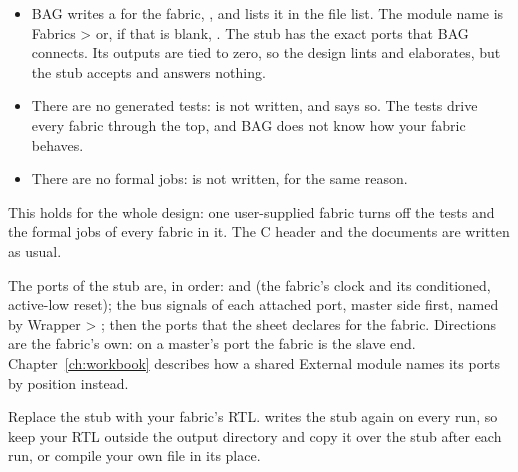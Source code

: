 \begin{itemize}
\item BAG writes a  for the fabric, , and lists it in
  the file list. The module name is Fabrics >  or, if that is
  blank, . The stub has the exact ports that BAG connects. Its
  outputs are tied to zero, so the design lints and elaborates, but the stub accepts and
  answers nothing.
\item There are no generated tests:  is not written, and
   says so. The tests drive every fabric through the top, and BAG
  does not know how your fabric behaves.
\item There are no formal jobs:  is not written, for the same reason.
\end{itemize}

This holds for the whole design: one user-supplied fabric turns off the tests and the
formal jobs of every fabric in it. The C header and the documents are written as usual.



The ports of the stub are, in order:  and  (the fabric's clock
and its conditioned, active-low reset); the bus signals of each attached port, master
side first, named by Wrapper > ; then the ports that the
 sheet declares for the fabric. Directions are the fabric's own: on a master's
port the fabric is the slave end. Chapter~\ref{ch:workbook} describes how a shared
External module names its ports by position instead.

Replace the stub with your fabric's RTL.  writes the stub again on
every run, so keep your RTL outside the output directory and copy it over the stub
after each run, or compile your own file in its place.
